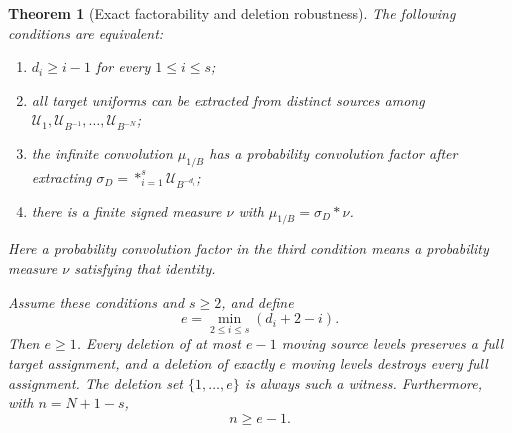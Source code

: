 \documentclass[11pt,letterpaper]{article}
\newtheorem{theorem}{Theorem}[section]
\theoremstyle{definition}
\theoremstyle{remark}
\newcommand{\Un}{\mathcal U}
\begin{document}
\begin{theorem}[Exact factorability and deletion robustness]
\label{thm:hall}
The following conditions are equivalent:
\begin{enumerate}
\item $d_i\ge i-1$ for every $1\le i\le s$;
\item all target uniforms can be extracted from distinct sources among
      $\Un_1,\Un_{B^{-1}},\ldots,\Un_{B^{-N}}$;
\item the infinite convolution $\mu_{1/B}$ has a probability convolution
      factor after extracting $\sigma_D=\mathop{*}_{i=1}^{s}\Un_{B^{-d_i}}$;
\item there is a finite signed measure $\nu$ with
      $\mu_{1/B}=\sigma_D*\nu$.
\end{enumerate}
Here a probability convolution factor in the third condition means a
probability measure $\nu$ satisfying that identity.

Assume these conditions and $s\ge2$, and define
\begin{equation}
 e=\min_{2\le i\le s}(d_i+2-i).
 \label{hall:e}
\end{equation}
Then $e\ge1$. Every deletion of at most $e-1$ moving source levels preserves
a full target assignment, and a deletion of exactly $e$ moving levels
destroys every full assignment. The deletion set $\{1,\ldots,e\}$ is
always such a witness. Furthermore, with $n=N+1-s$,
\begin{equation}
 n\ge e-1.
 \label{hall:residual-count}
\end{equation}
\end{theorem}
\end{document}
